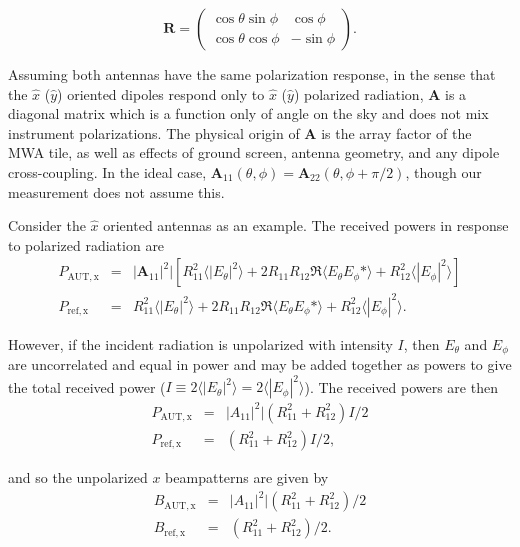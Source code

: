 \begin{equation}
\label{eqn:rotmat}
\textbf{R}=\left(\begin{array}{ccc}
\cos\theta\sin\phi & \cos\phi\\
\cos\theta\cos\phi & -\sin\phi
\end{array}\right).
\end{equation}


Assuming both antennas have the same polarization response, in the sense that the $\hat{x}$ ($\hat{y}$) oriented dipoles respond only to $\hat{x}$ ($\hat{y}$) polarized radiation, $\textbf{A}$ is a diagonal matrix which is a function only of angle on the sky and does not mix instrument polarizations. The physical origin of $\textbf{A}$ is the array factor of the MWA tile, as well as effects of ground screen, antenna geometry, and any dipole cross-coupling. In the ideal case, $\textbf{A}_{11}(\theta,\phi)=\textbf{A}_{22}(\theta,\phi+\pi/2)$, though our measurement does not assume this.

Consider the $\hat{x}$ oriented antennas as an example. The received powers in response to polarized radiation are
\begin{eqnarray}
P_\mathrm{AUT,x}&=& |\textbf{A}_{11}|^2|[R_{11}^2\langle|E_\theta|^2\rangle+2R_{11}R_{12}\Re\langle E_\theta E_\phi*\rangle +R_{12}^2\langle|E_\phi|^2\rangle]\label{eqn:poweraut} \\
P_\mathrm{ref,x}&=&R_{11}^2\langle|E_\theta|^2\rangle+2R_{11}R_{12}\Re\langle E_\theta E_\phi*\rangle+R_{12}^2\langle|E_\phi|^2\rangle.\label{eqn:powerref}
\end{eqnarray}


However, if the incident radiation is unpolarized with intensity $I$, then $E_\theta$ and $E_\phi$ are uncorrelated and equal in power and may be added together as powers to give the total received power ($I\equiv2\langle|E_\theta|^2\rangle=2\langle|E_\phi|^2\rangle$). The received powers are then
 \begin{eqnarray}
P_\mathrm{AUT,x}&=& |A_{11}|^2|(R_{11}^2+R_{12}^2)I/2 \\
P_\mathrm{ref,x}&=&(R_{11}^2+R_{12}^2)I/2,
\end{eqnarray}

and so the unpolarized $x$ beampatterns are given by
\begin{eqnarray}
B_\mathrm{AUT,x}&=& |A_{11}|^2|(R_{11}^2+R_{12}^2)/2\label{eqn:autbeam} \\
B_\mathrm{ref,x}&=&(R_{11}^2+R_{12}^2)/2\label{eqn:refbeam}.
\end{eqnarray}

